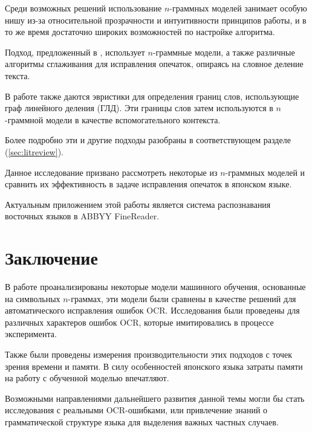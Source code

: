 \documentclass[14pt,russian]{extreport}
\theoremstyle{definition}
\begin{document}
Среди возможных решений использование $n$-граммных моделей занимает особую нишу из-за относительной прозрачности и интуитивности принципов работы, и в то же время достаточно широких возможностей по настройке алгоритма.

Подход, предложенный в \cite{nagata:shape}, использует $n$-граммные модели, а также различные алгоритмы сглаживания для исправления опечаток, опираясь на словное деление текста. 

В работе \cite{nagata:context} также даются эвристики для определения границ слов, использующие граф линейного деления (ГЛД). Эти границы слов затем используются в $n$-граммной модели в качестве вспомогательного контекста.

Более подробно эти и другие подходы разобраны в соответствующем разделе (\ref{sec:litreview}).

Данное исследование призвано рассмотреть некоторые из $n$-граммных моделей и сравнить их эффективность в задаче исправления опечаток в японском языке.

Актуальным приложением этой работы является система распознавания восточных языков в ABBYY FineReader.

\newpage


\newpage


\newpage


\newpage


\newpage


\newpage


\newpage


\newpage
\section{ Заключение }\label{sec:epilogue}

В работе проанализированы некоторые модели машинного обучения, основанные на символьных $n$-граммах, эти модели были сравнены в качестве решений для автоматического исправления ошибок OCR. Исследования были проведены для различных характеров ошибок OCR, которые имитировались в процессе эксперимента.

Также были проведены измерения производительности этих подходов с точек зрения времени и памяти. В силу особенностей японского языка затраты памяти на работу с обученной моделью впечатляют.

Возможными направлениями дальнейшего развития данной темы могли бы стать исследования с реальными OCR-ошибками, или привлечение знаний о грамматической структуре языка для выделения важных частных случаев.

\newpage

\end{document}
